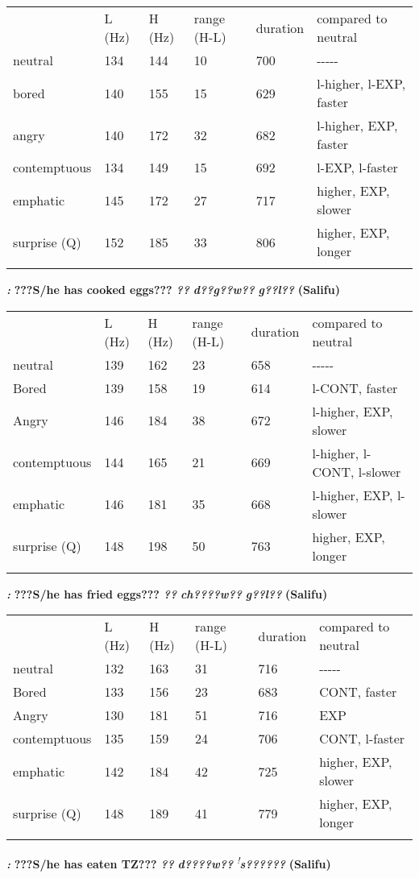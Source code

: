 \documentclass[output=paper]{langsci/langscibook}
\begin{document}
\begin{tabular}{llllll} & L (Hz) & H (Hz) & range (H-L) & duration & compared to neutral\\
\lsptoprule
neutral & 134 & 144 & 10 & 700 & {}-{}-{}-{}-{}-\\
bored & 140 & 155 & 15 & 629 & l-higher, l-EXP, faster\\
angry & 140 & 172 & 32 & 682 & l-higher, EXP, faster\\
contemptuous & 134 & 149 & 15 & 692 & l-EXP, l-faster\\
emphatic & 145 & 172 & 27 & 717 & higher, EXP, slower\\
surprise (Q) & 152 & 185 & 33 & 806 & higher, EXP, longer\\
\lspbottomrule
\end{tabular}
\textbf{ }\emph{\textbf{\textup{:}}}\textbf{ ???}\textbf{S/he has cooked eggs???  }\emph{\textbf{??}}\emph{\textbf{ d??g??}}\emph{\textbf{w??}}\emph{\textbf{ g??l??}}\textbf{  (Salifu)}

\begin{tabular}{llllll} & L (Hz) & H (Hz) & range (H-L) & duration & compared to neutral\\
\lsptoprule
neutral & 139 & 162 & 23 & 658 & {}-{}-{}-{}-{}-\\
Bored & 139 & 158 & 19 & 614 & l-CONT, faster\\
Angry & 146 & 184 & 38 & 672 & l-higher, EXP, slower\\
contemptuous & 144 & 165 & 21 & 669 & l-higher, l-CONT, l-slower\\
emphatic & 146 & 181 & 35 & 668 & l-higher, EXP, l-slower\\
surprise (Q) & 148 & 198 & 50 & 763 & higher, EXP, longer\\
\lspbottomrule
\end{tabular}
\emph{\textbf{\textup{:}}}\textbf{ ???S}\textbf{/he has fried eggs???   }\emph{\textbf{??}}\emph{\textbf{ ch????}}\emph{\textbf{w??}}\emph{\textbf{ g??l??}}\textbf{  (Salifu)}

\begin{tabular}{llllll} & L (Hz) & H (Hz) & range (H-L) & duration & compared to neutral\\
\lsptoprule
neutral & 132 & 163 & 31 & 716 & {}-{}-{}-{}-{}-\\
Bored & 133 & 156 & 23 & 683 & CONT, faster\\
Angry & 130 & 181 & 51 & 716 & EXP\\
contemptuous & 135 & 159 & 24 & 706 & CONT, l-faster\\
emphatic & 142 & 184 & 42 & 725 & higher, EXP, slower\\
surprise (Q) & 148 & 189 & 41 & 779 & higher, EXP, longer\\
\lspbottomrule
\end{tabular}
\emph{\textbf{\textup{:}}}\textbf{ ???S}\textbf{/he has eaten TZ???  }\emph{\textbf{??}}\emph{\textbf{ d????}}\emph{\textbf{w??}}\emph{\textbf{ }}\textit{\textsuperscript{!}}\emph{\textbf{s??????}}\textbf{  (Salifu)}
\end{document}
